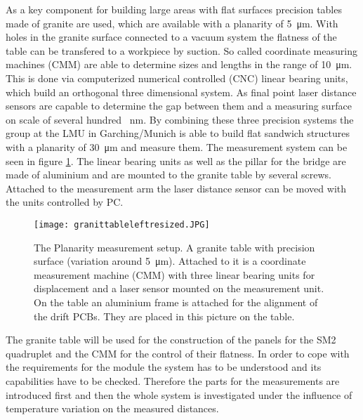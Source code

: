 \documentclass[
a4paper,                                %
twoside,                                %
BCOR1.4cm,                      %
10pt,                           %
headings=normal,                %
headsepline,                    %
clearplainpage, %
final,                                  %
div=14,
parskip=full,
openright,
bibliography=toc
]{scrreprt}
\begin{document}
As a key component for building large areas with flat surfaces precision tables made of granite are used, which are available with a planarity of \SI{5}{\micro\m}. With holes in the granite surface connected to a vacuum system the flatness of the table can be transfered to a workpiece by suction. So called coordinate measuring machines (CMM) are able to determine sizes and lengths in the range of \SI{10}{\micro\m}. This is done via computerized numerical controlled (CNC) linear bearing units, which build an orthogonal three dimensional system. As final point laser distance sensors are capable to determine the gap between them and a measuring surface on scale of several hundred \SI{}{\nm}. By combining these three precision systems the group at the LMU in Garching/Munich is able to build flat sandwich structures with a planarity of \SI{30}{\micro\m} and measure them. The measurement system can be seen in figure \ref{granitetibale}. The linear bearing units as well as the pillar for the bridge are made of aluminium and are mounted to the granite table by several screws. Attached to the measurement arm the laser distance sensor can be moved with the units controlled by PC. 


\begin{figure}[H]
	\centering
	\texttt{[image: granittableleftresized.JPG]}
	\caption{The Planarity measurement setup. A granite table with precision surface (variation around \SI{5}{\micro\m}). Attached to it is a coordinate measurement machine (CMM) with three linear bearing units for displacement and a laser sensor mounted on the measurement unit. On the table an aluminium frame is attached for the alignment of the drift PCBs. They are placed in this picture on the table.}
	\label{granitetibale}
\end{figure}

The granite table will be used for the construction of the panels for the SM2 quadruplet and the CMM for the control of their flatness. In order to cope with the requirements for the module the system has to be understood and its capabilities have to be checked. Therefore the parts for the measurements are introduced first and then the whole system is investigated under the influence of temperature variation on the measured distances.
\end{document}
